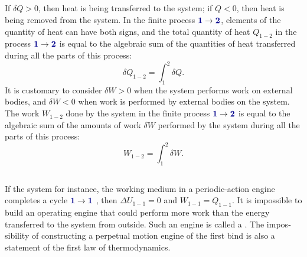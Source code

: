 \subsection{}\label{9.3.2} If $\delta Q > 0$, then heat is being transferred to the system; if $Q < 0$, then heat is being removed from the system. In the finite process $\hlblue{1} \to \hlblue{2}$, elements of the quantity of heat can have both signs, and the total quantity of heat $Q_{1-2}$ in the process $\hlblue{1} \to \hlblue{2}$ is equal to the algebraic sum of the quantities of heat transferred during all the parts of this process:
\begin{equation*}%
\delta Q_{1-2} = \int_{1}^{2} \delta Q.
\end{equation*}
It is customary to consider $\delta W> 0$ when the system performs work on external bodies, and $\delta W < 0$ when work is performed by external bodies on the system. The work $W_{1-2}$ done by the system in the finite process $\hlblue{1} \to \hlblue{2}$ is equal to the algebraic sum of the amounts of work $\delta W$ performed by the system during all the parts of this process:
\begin{equation*}%
W_{1-2} = \int_{1}^{2} \delta W.
\end{equation*}


\subsection{}\label{9.3.3} If the system for instance, the working medium  in a periodic-action engine completes a cycle $\hlblue{1} \to \hlblue{1}$ , then $\Delta U_{1-1}= 0$ and $W_{1-1}= Q_{1-1}$. It is impossible to build an operating engine that could perform more work than the energy transferred to the system from outside. Such an engine is called a . The impos­sibility of constructing a perpetual motion engine of the first bind is also a statement of the first law of thermodynamics.

